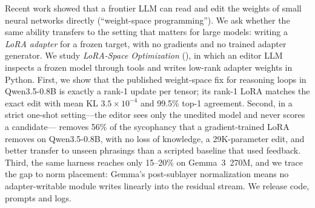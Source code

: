 Recent work showed that a frontier LLM can read and edit the weights of small neural networks directly
(``weight-space programming''). We ask whether the same ability transfers to the setting that matters for large
models: writing a \emph{LoRA adapter} for a frozen target, with no gradients and no trained adapter generator.
We study \emph{LoRA-Space Optimization} (\lso{}), in which an editor LLM inspects a frozen model through tools and
writes low-rank adapter weights in Python. First, we show that the published weight-space fix for reasoning loops in
Qwen3.5-0.8B is exactly a rank-1 update per tensor; its rank-1 LoRA matches the exact edit with mean KL
$3.5\times10^{-4}$ and 99.5\% top-1 agreement. Second, in a strict one-shot setting---the editor sees only the
unedited model and never scores a candidate---\astra{} removes 56\% of the sycophancy that a gradient-trained LoRA
removes on Qwen3.5-0.8B, with no loss of knowledge, a 29K-parameter edit, and better transfer to unseen phrasings
than a scripted baseline that used feedback. Third, the same harness reaches only 15--20\% on Gemma~3~270M, and we
trace the gap to norm placement: Gemma's post-sublayer normalization means no adapter-writable module writes
linearly into the residual stream. We release code, prompts and logs. 
